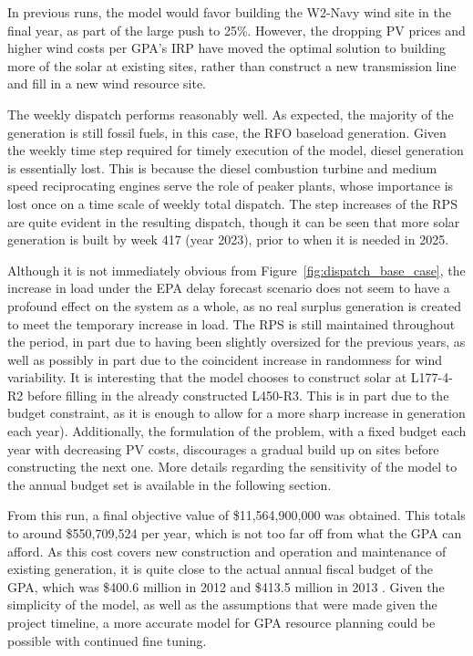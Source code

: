\documentclass[12pt,letterpaper,fleqn]{article}
\begin{document}
In previous runs, the model would favor building the W2-Navy wind site
in the final year, as part of the large push to 25\%. However, the
dropping PV prices and higher wind costs per GPA's IRP have moved the
optimal solution to building more of the solar at existing sites,
rather than construct a new transmission line and fill in a new wind
resource site. 

The weekly dispatch performs reasonably well. As expected, the
majority of the generation is still fossil fuels, in this case, the
RFO baseload generation. Given the weekly time step required for
timely execution of the model, diesel generation is essentially
lost. This is because the diesel combustion turbine and medium speed
reciprocating engines serve the role of peaker plants, whose
importance is lost once on a time scale of weekly total dispatch. The
step increases of the RPS are quite evident in the resulting dispatch,
though it can be seen that more solar generation is built by week 417
(year 2023), prior to when it is needed in 2025. 

Although it is not immediately obvious from
Figure~\ref{fig:dispatch_base_case}, the increase in load under the
EPA delay forecast scenario does not seem to have a profound effect on
the system as a whole, as no real surplus generation is created to
meet the temporary increase in load. The RPS is still maintained
throughout the period, in part due to having been slightly oversized
for the previous years, as well as possibly in part due to the
coincident increase in randomness for wind variability. It is
interesting that the model chooses to construct solar at L177-4-R2
before filling in the already constructed L450-R3. This is in part due
to the budget constraint, as it is enough to allow for a more sharp
increase in generation each year). Additionally, the formulation of
the problem, with a fixed budget each year with decreasing PV costs,
discourages a gradual build up on sites before constructing the next
one. More details regarding the sensitivity of the model to the annual
budget set is available in the following section.

From this run, a final objective value of \$11,564,900,000 was
obtained. This totals to around \$550,709,524 per year, which is not
too far off from what the GPA can afford. As this cost covers new
construction and operation and maintenance of existing generation, it
is quite close to the actual annual fiscal budget of the GPA, which
was \$400.6 million in 2012 and \$413.5 million in 2013
\cite{cruz13}. Given the simplicity of the model, as well as the
assumptions that were made given the project timeline, a more accurate
model for GPA resource planning could be possible with continued fine
tuning.
\end{document}
